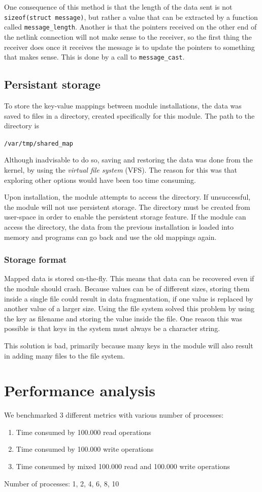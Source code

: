 \documentclass[final,a4paper]{article}
\begin{document}
One consequence of this method is that the length of the data sent is not
\texttt{sizeof(struct message)}, but rather a value that can be extracted by a
function called \texttt{message\_length}. Another is that the pointers received
on the other end of the netlink connection will not make sense to the receiver,
so the first thing the receiver does once it receives the message is to update
the pointers to something that makes sense. This is done by a call to
\texttt{message\_cast}.

\subsection{Persistant storage}
To store the key-value mappings between module installations, the data was
saved to files in a directory, created specifically for this module. The path
to the directory is
\begin{center}
\texttt{/var/tmp/shared\_map}
\end{center}
Although inadvisable to do so, saving and restoring the data was done from
the kernel, by using the \emph{virtual file system} (VFS). The reason for this
was that exploring other options would have been too time consuming.

Upon installation, the module attempts to access the directory. If unsuccessful,
the module will not use persistent storage. The directory must be created from
user-space in order to enable the persistent storage feature. If the module can
access the directory, the data from the previous installation is loaded into
memory and programs can go back and use the old mappings again.

\subsubsection*{Storage format}
Mapped data is stored on-the-fly. This means that data can be recovered even
if the module should crash. Because values can be of different sizes, storing
them inside a single file could result in data fragmentation, if one value
is replaced by another value of a larger size. Using the file system solved this
problem by using the key as filename and storing the value inside the file. One
reason this was possible is that keys in the system must  always be a character
string.

This solution is bad, primarily because many keys in the module will also result
in adding many files to the file system.

\section{Performance analysis}
We benchmarked 3 different metrics with various number of processes:
\begin{enumerate}
  \setlength\itemsep{-0.5em}
  \item Time consumed by 100.000 read operations
  \item Time consumed by 100.000 write operations
  \item Time consumed by mixed 100.000 read and 100.000 write operations
\end{enumerate}
Number of processes: 1, 2, 4, 6, 8, 10
\end{document}
